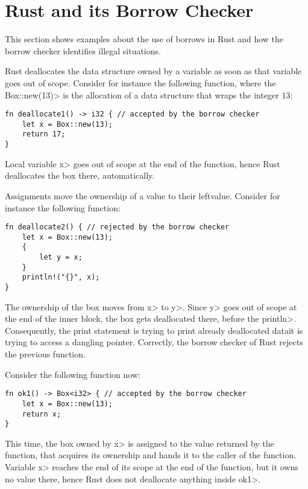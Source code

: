 \section{Rust and its Borrow Checker}\label{sec:rust}

This section shows examples about the use of borrows in
Rust and how the borrow checker identifies illegal situations.

Rust deallocates the data structure owned by a variable
as soon as that variable goes out of scope. Consider for instance
the following function, where the \<Box::new(13)> is the allocation of
a data structure that wraps the integer $13$:

\begin{verbatim}
fn deallocate1() -> i32 { // accepted by the borrow checker
    let x = Box::new(13);
    return 17;
}
\end{verbatim}

\noindent
Local variable \<x> goes out of scope at the end of the function,
hence Rust deallocates the box there, automatically.

Assignments move the ownership of a value to their leftvalue. Consider
for instance the following function:

\begin{verbatim}
fn deallocate2() { // rejected by the borrow checker
    let x = Box::new(13);
    {
        let y = x;
    }
    println!("{}", x);
}
\end{verbatim}

\noindent
The ownership of the box moves from \<x> to \<y>. Since \<y> goes out of scope
at the end of the inner block, the box gets deallocated there, before the
\<println>. Consequently, the print statement is trying to print
already deallocated data\ie it is trying to access a dangling pointer.
Correctly, the borrow checker of Rust rejects the previous function.

Consider the following function now:

\begin{verbatim}
fn ok1() -> Box<i32> { // accepted by the borrow checker
    let x = Box::new(13);
    return x;
}
\end{verbatim}

\noindent
This time, the box owned by \<x> is assigned to the value returned by
the function, that acquires its ownership and hands it to the caller of
the function. Variable \<x> reaches the end of its scope at the end of the
function, but it owns no value there, hence Rust does not deallocate
anything inside \<ok1>.

